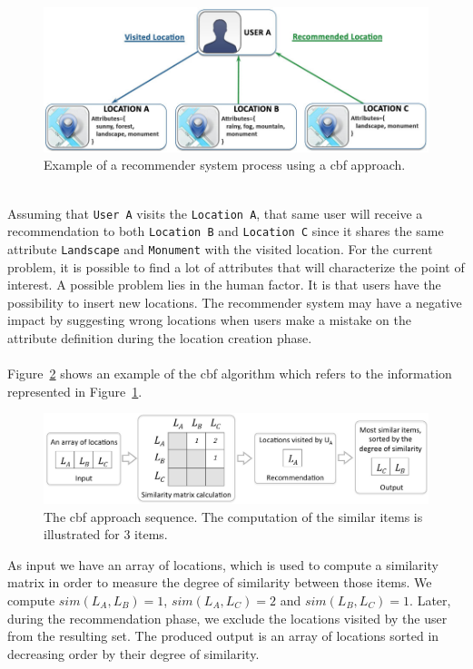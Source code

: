 \\
\begin{figure}[h!]
 \centering
   \includegraphics[width=12 cm]{./images/examples/example_content_based_filtering.jpg}
   \caption{Example of a recommender system process using a \gls{cbf} approach.}
   \label{fig:exampleCBF}
\end{figure}
\\
Assuming that \verb"User A" visits the \verb"Location A", that same user will receive a recommendation to both \verb"Location B" and \verb"Location C" since it shares the same attribute \verb"Landscape" and \verb"Monument" with the visited location. For the current problem, it is possible to find a lot of attributes that will characterize the point of interest. A possible problem lies in the human factor. It is that users have the possibility to insert new locations. The recommender system may have a negative impact by suggesting wrong locations when users make a mistake on the attribute definition during the location creation phase.\\
\\
Figure~\ref{fig:exampleALgCBF} shows an example of the \gls{cbf} algorithm which refers to the information represented in Figure~\ref{fig:exampleCBF}.
\begin{figure}[h!]
 \centering
   \includegraphics[width=14.5 cm]{./images/flows/flow_example_diagram_cbf.jpg}
   \caption{The \gls{cbf} approach sequence. The computation of the similar items is illustrated for 3 items.}
   \label{fig:exampleALgCBF}
\end{figure}
As input we have an array of locations, which is used to compute a similarity matrix in order to measure the degree of similarity between those items. We compute $sim(L_{A},L_{B})=1$, $sim(L_{A},L_{C})=2$ and $sim(L_{B},L_{C})=1$. Later, during the recommendation phase, we exclude the locations visited by the user from the resulting set. The produced output is an array of locations sorted in decreasing order by their degree of similarity.

